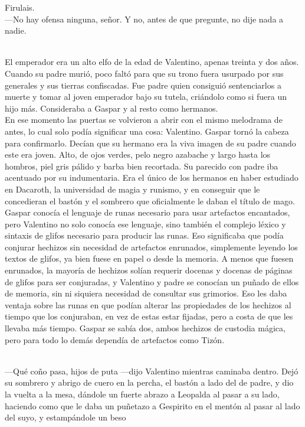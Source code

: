 \documentclass[
  letterpaper,
]{book}
\begin{document}
Firulais.\\
---No hay ofensa ninguna, señor. Y no, antes de que pregunte, no dije
nada a nadie.\\
\strut \\
El emperador era un alto elfo de la edad de Valentino, apenas treinta y
dos años. Cuando su padre murió, poco faltó para que su trono fuera
usurpado por sus generales y sus tierras confiscadas. Fue padre quien
consiguió sentenciarlos a muerte y tomar al joven emperador bajo su
tutela, criándolo como si fuera un hijo más. Consideraba a Gaspar y al
resto como hermanos.\\
En ese momento las puertas se volvieron a abrir con el mismo melodrama
de antes, lo cual solo podía significar una cosa: Valentino. Gaspar
tornó la cabeza para confirmarlo. Decían que su hermano era la viva
imagen de su padre cuando este era joven. Alto, de ojos verdes, pelo
negro azabache y largo hasta los hombros, piel gris pálido y barba bien
recortada. Su parecido con padre iba acentuado por su indumentaria. Era
el único de los hermanos en haber estudiado en Dacaroth, la universidad
de magia y runismo, y en conseguir que le concedieran el bastón y el
sombrero que oficialmente le daban el título de mago. Gaspar conocía el
lenguaje de runas necesario para usar artefactos encantados, pero
Valentino no solo conocía ese lenguaje, sino también el complejo léxico
y sintaxis de glifos necesario para producir las runas. Eso significaba
que podía conjurar hechizos sin necesidad de artefactos enrunados,
simplemente leyendo los textos de glifos, ya bien fuese en papel o desde
la memoria. A menos que fuesen enrunados, la mayoría de hechizos solían
requerir docenas y docenas de páginas de glifos para ser conjuradas, y
Valentino y padre se conocían un puñado de ellos de memoria, sin ni
siquiera necesidad de consultar sus grimorios. Eso les daba ventaja
sobre las runas en que podían alterar las propiedades de los hechizos al
tiempo que los conjuraban, en vez de estas estar fijadas, pero a costa
de que les llevaba más tiempo. Gaspar se sabía dos, ambos hechizos de
custodia mágica, pero para todo lo demás dependía de artefactos como
Tizón.\\
\strut \\
---Qué coño pasa, hijos de puta ---dijo Valentino mientras caminaba
dentro. Dejó su sombrero y abrigo de cuero en la percha, el bastón a
lado del de padre, y dio la vuelta a la mesa, dándole un fuerte abrazo a
Leopalda al pasar a su lado, haciendo como que le daba un puñetazo a
Gespirito en el mentón al pasar al lado del suyo, y estampándole un beso
\end{document}
